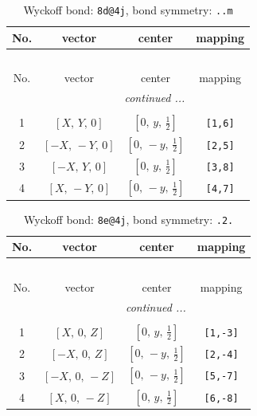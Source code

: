 \documentclass[fleqn,8pt]{jsarticle}
\begin{document}
\begin{longtable}{cccc}
\caption{Wyckoff bond: {\tt 8d@4j}, bond symmetry: {\tt ..m}}
 \\
 \hline \hline
No. & vector & center & mapping \\ \hline \endfirsthead

\multicolumn{3}{l}{\tablename\ \thetable{}} \\
 \hline \hline
No. & vector & center & mapping \\ \hline \endhead

 \hline \hline
\multicolumn{3}{r}{\footnotesize\it continued ...} \\ \endfoot

 \hline \hline
\multicolumn{3}{r}{} \\ \endlastfoot

1 & $\left[ X,\, Y,\, 0 \right]$ & $\left[ 0,\, y,\, \frac{1}{2} \right]$ & {\tt [1,6]} \\ \hline
2 & $\left[ - X,\, - Y,\, 0 \right]$ & $\left[ 0,\, - y,\, \frac{1}{2} \right]$ & {\tt [2,5]} \\ \hline
3 & $\left[ - X,\, Y,\, 0 \right]$ & $\left[ 0,\, y,\, \frac{1}{2} \right]$ & {\tt [3,8]} \\ \hline
4 & $\left[ X,\, - Y,\, 0 \right]$ & $\left[ 0,\, - y,\, \frac{1}{2} \right]$ & {\tt [4,7]} \\
\end{longtable}
\renewcommand{\arraystretch}{1.2}
\begin{longtable}{cccc}
\caption{Wyckoff bond: {\tt 8e@4j}, bond symmetry: {\tt .2.}}
 \\
 \hline \hline
No. & vector & center & mapping \\ \hline \endfirsthead

\multicolumn{3}{l}{\tablename\ \thetable{}} \\
 \hline \hline
No. & vector & center & mapping \\ \hline \endhead

 \hline \hline
\multicolumn{3}{r}{\footnotesize\it continued ...} \\ \endfoot

 \hline \hline
\multicolumn{3}{r}{} \\ \endlastfoot

1 & $\left[ X,\, 0,\, Z \right]$ & $\left[ 0,\, y,\, \frac{1}{2} \right]$ & {\tt [1,-3]} \\ \hline
2 & $\left[ - X,\, 0,\, Z \right]$ & $\left[ 0,\, - y,\, \frac{1}{2} \right]$ & {\tt [2,-4]} \\ \hline
3 & $\left[ - X,\, 0,\, - Z \right]$ & $\left[ 0,\, - y,\, \frac{1}{2} \right]$ & {\tt [5,-7]} \\ \hline
4 & $\left[ X,\, 0,\, - Z \right]$ & $\left[ 0,\, y,\, \frac{1}{2} \right]$ & {\tt [6,-8]} \\
\end{longtable}
\end{document}
